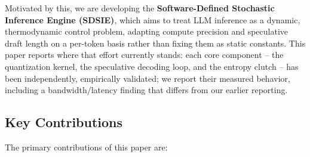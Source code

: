 \documentclass[10pt,journal,compsoc,twocolumn]{IEEEtran}
\begin{document}
Motivated by this, we are developing the \textbf{Software-Defined Stochastic Inference Engine (SDSIE)}, which aims to treat LLM inference as a dynamic, thermodynamic control problem, adapting compute precision and speculative draft length on a per-token basis rather than fixing them as static constants. This paper reports where that effort currently stands: each core component -- the quantization kernel, the speculative decoding loop, and the entropy clutch -- has been independently, empirically validated; we report their measured behavior, including a bandwidth/latency finding that differs from our earlier reporting.

\subsection{Key Contributions}
The primary contributions of this paper are:
\end{document}
